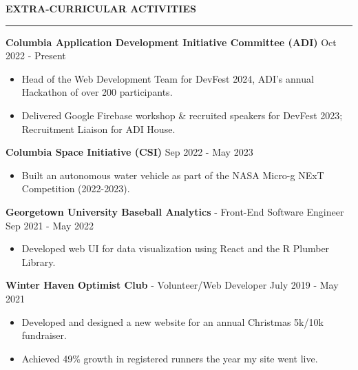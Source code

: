 \documentclass[10pt,letterpaper]{article}
\begin{document}


\medskip
\MakeUppercase{{\bf Extra-Curricular Activities}}
\medskip
\hrule
\begin{list}{}{\setlength{\leftmargin}{0em}}
    \item
          \textbf{Columbia Application Development Initiative Committee (ADI)} \hfill Oct 2022 - Present
          \begin{itemize}
              \item Head of the Web Development Team for DevFest 2024, ADI's annual Hackathon of over 200 participants.  \
              \item Delivered Google Firebase workshop \& recruited speakers for DevFest 2023; Recruitment Liaison for ADI House.
          \end{itemize}
    \item
          \textbf{Columbia Space Initiative (CSI)} \hfill Sep 2022 - May 2023
          \begin{itemize}
              \item Built an autonomous water vehicle as part of the NASA Micro-g NExT Competition (2022-2023).
          \end{itemize}
    \item
          \textbf{Georgetown University Baseball Analytics} - Front-End Software Engineer \hfill Sep 2021 - May 2022
          \begin{itemize}
              \item Developed web UI for data visualization using React and the R Plumber Library.
          \end{itemize}

    \item
          \textbf{Winter Haven Optimist Club} - Volunteer/Web Developer \hfill July 2019 - May 2021
          \begin{itemize}
              \item Developed and designed a new website for an annual Christmas 5k/10k fundraiser.
              \item Achieved 49\% growth in registered runners the year my site went live.
          \end{itemize}
\end{list}
\end{document}

